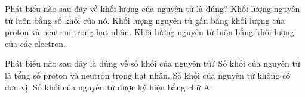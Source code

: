 \begin{ex}%
	Phát biểu nào sau đây về khối lượng của nguyên tử là đúng?
	{Khối lượng nguyên tử luôn bằng số khối của nó.}
	{\True Khối lượng nguyên tử gần bằng khối lượng của proton và neutron trong hạt nhân.}
	{Khối lượng nguyên tử luôn bằng khối lượng của các electron.}
\end{ex}

\begin{ex}%
	Phát biểu nào sau đây là đúng về số khối của nguyên tử?
	{\True Số khối của nguyên tử là tổng số proton và neutron trong hạt nhân.}
	{\True Số khối của nguyên tử không có đơn vị.}
	{\True Số khối của nguyên tử được ký hiệu bằng chữ A.}
\end{ex}

